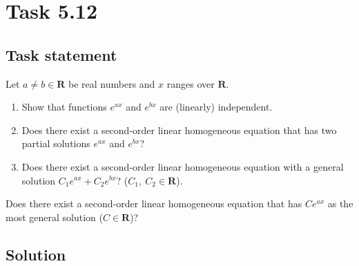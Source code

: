 \section*{Task 5.12}

\subsection*{Task statement}

Let $a \neq b \in \mathbf{R}$ be real numbers and $x$ ranges over $\mathbf{R}$.

\begin{enumerate}[label=\alph*]
    \item Show that functions $e^{ax}$ and $e^{bx}$ are (linearly) independent.
    \item Does there exist a second-order linear homogeneous equation that has two partial solutions $e^{ax}$ and $e^{bx}$?
    \item Does there exist a second-order linear homogeneous equation with a general solution $C_1 e^{ax} + C_2 e^{bx}$? ($C_1,\ C_2 \in \mathbf{R}$).
\end{enumerate}

Does there exist a second-order linear homogeneous equation that has $Ce^{ax}$ as the most general solution ($C \in \mathbf{R}$)?

\subsection*{Solution}

